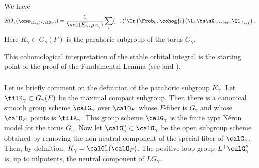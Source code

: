\begin{theorem}\label{th:orb coho} We have
\begin{equation}\label{d}
SO_{\gamma}(\one_{\frg(\calO_{F})})=\frac{1}{\vol(K_{\gamma},\mu_{G_{\gamma}})}\sum_{i}(-1)^{i}\Tr\left(\Frob_{k}, \cohog{i}{\L_{\gamma}\bs\sX_{\gamma,\kbar},\Ql}_{\st}\right).
\end{equation}
Here $K_{\gamma}\subset G_{\gamma}(F)$ is the parahoric subgroup of the torus $G_{\gamma}$. 
\end{theorem}

This cohomological interpretation of the stable orbital integral is the starting point of the proof of the Fundamental Lemma (see \cite{GKM} and \cite{NgoFL}). 


\subsubsection{}\label{sss:K gamma} Let us briefly comment on the definition of the parahoric subgroup $K_{\gamma}$. Let $\tilK_{\gamma}\subset G_{\gamma}(F)$ be the maximal compact subgroup. Then there is a canonical smooth group scheme $\calG_{\gamma}$ over $\calO_{F}$ whose $F$-fiber is $G_{\gamma}$ and whose $\calO_{F}$ points is $\tilK_{\gamma}$. This group scheme $\calG_{\gamma}$ is the finite type N\'eron model for the torus $G_{\gamma}$. Now let $\calG^{\circ}_{\gamma}\subset\calG_{\gamma}$ be the open subgroup scheme obtained by removing the non-neutral component of the special fiber of $\calG_{\gamma}$. Then, by definition, $K_{\gamma}=\calG^{\circ}_{\gamma}(\calO_{F})$. The positive loop group $L^{+}\calG^{\circ}_{\gamma}$ is, up to nilpotents, the neutral component of $LG_{\gamma}$.


